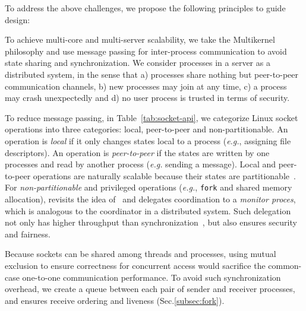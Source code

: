 To address the above challenges, we propose the following principles to guide \sys design:

To achieve multi-core and multi-server scalability, we take the Multikernel~\cite{baumann2009multikernel} philosophy and use message passing for inter-process communication to avoid state sharing and synchronization. We consider processes in a server as a distributed system, in the sense that a) processes share nothing but peer-to-peer communication channels, b) new processes may join at any time, c) a process may crash unexpectedly and d) no user process is trusted in terms of security. 

To reduce message passing, in Table~\ref{tab:socket-api}, we categorize Linux socket operations into three categories: local, peer-to-peer and non-partitionable. An operation is \textit{local} if it only changes states local to a process (\textit{e.g.}, assigning file descriptors). An operation is \textit{peer-to-peer} if the states are written by one processes and read by another process (\textit{e.g.} sending a message).
Local and peer-to-peer operations are naturally scalable because their states are partitionable~\cite{partitionable}. For \textit{non-partitionable} and privileged operations (\textit{e.g.}, \texttt{fork} and shared memory allocation), \sys revisits the idea of~\cite{hoare1974monitors} and delegates coordination to a \emph{monitor proces}, which is analogous to the coordinator in a distributed system. Such delegation not only has higher throughput than synchronization~\cite{roghanchi2017ffwd}, but also ensures security and fairness.

Because sockets can be shared among threads and processes, using mutual exclusion to ensure correctness for concurrent access would sacrifice the common-case one-to-one communication performance. To avoid such synchronization overhead, we create a queue between each pair of sender and receiver processes, and ensures receive ordering and liveness (Sec.\ref{subsec:fork}).

